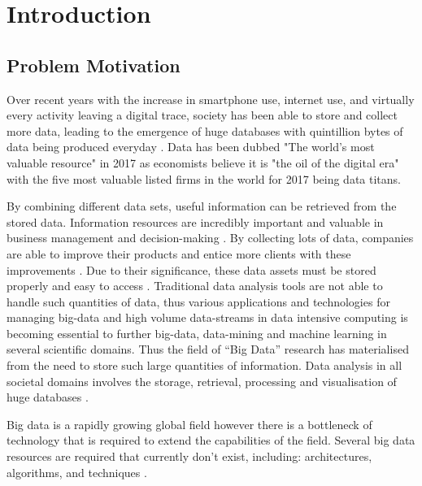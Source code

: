 %
%
%
%
\chapter{Introduction}\label{chap:introduction}
\vspace{-1cm}

\section{Problem Motivation}
Over recent years with the increase in smartphone use, internet use, and virtually every activity leaving a digital trace, society has been able to store and collect more data, leading to the emergence of huge databases with quintillion bytes of data being produced everyday \cite{economist:2017:twm}. Data has been dubbed "The world's most valuable resource" in 2017 as economists believe it is "the oil of the digital era" with the five most valuable listed firms in the world for 2017 being data titans\cite{economist:2017:twm}. 

By combining different data sets, useful information can be retrieved from the stored data. Information resources are incredibly important and valuable in business management and decision-making \cite{golfarelli:2009:dwd,wang:2014sar}. By collecting lots of data, companies are able to improve their products and entice more clients with these improvements \cite{economist:2017:twm}. Due to their significance, these data assets must be stored properly and easy to access \cite{golfarelli:2009:dwd}. Traditional data analysis tools are not able to handle such quantities of data, thus various applications and technologies for managing big-data and high volume data-streams in data intensive computing is becoming essential to further big-data, data-mining and machine learning in several scientific domains. Thus the field of “Big Data” research has materialised from the need to store such large quantities of information. Data analysis in all societal domains involves the storage, retrieval, processing and visualisation of huge databases \cite{otoo:2006:esa}. 

Big data is a rapidly growing global field however there is a bottleneck of technology that is required to extend the capabilities of the field. Several big data resources are required that currently don't exist, including: architectures, algorithms, and techniques \cite{twala:2017:bda,moukhi:2015:dws}.


